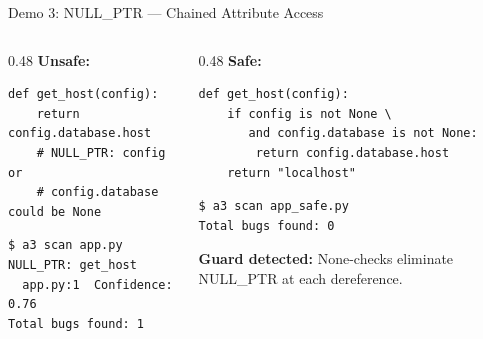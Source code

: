 \documentclass[aspectratio=169]{beamer}
\begin{document}
\begin{frame}[fragile]{Demo 3: NULL\_PTR --- Chained Attribute Access}

\begin{columns}[T]
\begin{column}{0.48\textwidth}
\textbf{Unsafe:}
\begin{lstlisting}
def get_host(config):
    return config.database.host
    # NULL_PTR: config or
    # config.database could be None
\end{lstlisting}

\begin{lstlisting}[style=bash]
$ a3 scan app.py
NULL_PTR: get_host
  app.py:1  Confidence: 0.76
Total bugs found: 1
\end{lstlisting}
\end{column}
\begin{column}{0.48\textwidth}
\textbf{Safe:}
\begin{lstlisting}
def get_host(config):
    if config is not None \
       and config.database is not None:
        return config.database.host
    return "localhost"
\end{lstlisting}

\begin{lstlisting}[style=bash]
$ a3 scan app_safe.py
Total bugs found: 0
\end{lstlisting}
\vspace{0.3em}
\textcolor{msgreen}{\textbf{Guard detected:}} None-checks eliminate NULL\_PTR at each dereference.
\end{column}
\end{columns}

\end{frame}
\end{document}
